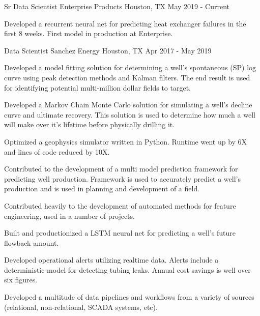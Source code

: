 


\begin{cventries}


\cventry
{Sr Data Scientist} %
{Enterprise Products} %
{Houston, TX} %
{May 2019 - Current} %
{ %
\begin{cvitems}
\item {Developed a recurrent neural net for predicting heat exchanger failures in the first 8 weeks. First model in production at Enterprise.}
\end{cvitems}
}


\cventry
{Data Scientist} %
{Sanchez Energy} %
{Houston, TX} %
{Apr 2017 - May 2019} %
{ %
\begin{cvitems}
\item {Developed a model fitting solution for determining a well's spontaneous (SP) log curve using peak detection methods and Kalman filters.
        The end result is used for identifying potential multi-million dollar fields to target.}
\item {Developed a Markov Chain Monte Carlo solution for simulating a well's decline curve and ultimate recovery.
        This solution is used to determine how much a well will make over it's lifetime before physically drilling it.}
\item {Optimized a geophysics simulator written in Python. Runtime went up by 6X and lines of code reduced by 10X.}
\item {Contributed to the development of a multi model prediction framework for predicting well production. 
        Framework is used to accurately predict a well's production and is used in planning and development of a field.}
\item {Contributed heavily to the development of automated methods for feature engineering, used in a number of projects.}
\item {Built and productionized a LSTM neural net for predicting a well's future flowback amount.}
\item {Developed operational alerts utilizing realtime data. Alerts include a deterministic model for detecting tubing leaks. 
        Annual cost savings is well over six figures.}
\item {Developed a multitude of data pipelines and workflows from a variety of sources (relational, non-relational, SCADA systems, etc).}
\end{cvitems}
}


\end{cventries}
